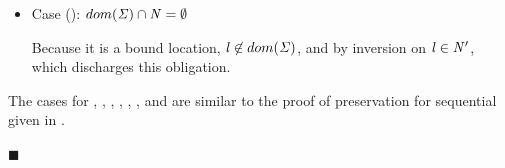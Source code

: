 \begin{bproof}
\begin{bcase}[\dregparletlocafternewreg{}]
\begin{enumerate}
\begin{itemize}
\begin{itemize}
\item Case ():
$(\reg \mapsto \emptyset) \in \AENV \Rightarrow (\reg \mapsto \emptyset) \in \STOR$

This case discharges because, from the premise of the
lemma, this property holds for the original environment
$\AENV$ and store $\STOR$, and, by inversion on \tllafter{},
continues to hold for $\AENV'$ and $\STOR'$.

\end{itemize}

\item Case ():
$dom(\mathit{\Sigma}) \cap \mathit{N} = \emptyset $

Because it is a bound location, $\mathit{l} \not \in dom(\mathit{\Sigma})$, and by inversion on \tllafter{}
$\mathit{l} \in \mathit{N}'$, which discharges this obligation.

\end{itemize}


\end{enumerate}

\end{bcase}

\begin{bcase}


The cases for \dletexp{}, \dletval{}, \dletregion, \dletloctag{}, \dletlocstart{}, \dletlocafter, and \dapp{}
are similar to the proof of preservation for sequential \seqcalc{} given in \cite{LoCal}.


\end{bcase}

$\blacksquare$
\end{bproof}
